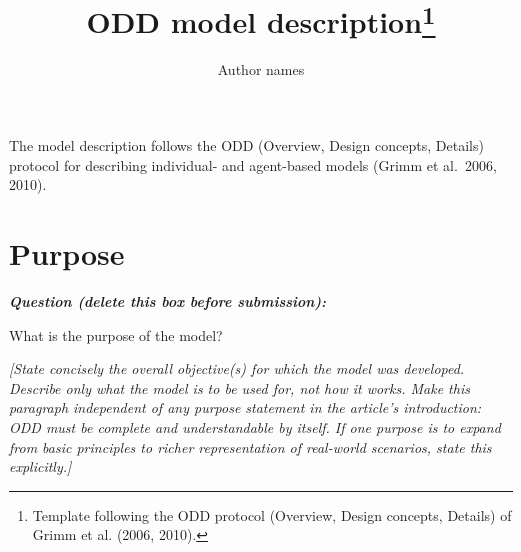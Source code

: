 \documentclass[11pt,a4paper]{article}
\title{ODD model description\thanks{Template following the ODD protocol
(Overview, Design concepts, Details) of Grimm et al. (2006, 2010).}}
\author{Author names}
\date{}
\newenvironment{question}
  {\begin{oddquestion}\small\itshape\color{oddquestioncolor}%
   \textbf{Question (delete this box before submission):}\par\smallskip}
  {\end{oddquestion}}
\begin{document}
\maketitle

The model description follows the ODD (Overview, Design concepts,
Details) protocol for describing individual- and agent-based models
(Grimm et al.\ 2006, 2010).


\section{Purpose}
\begin{question}
What is the purpose of the model?
\end{question}
\textit{[State concisely the overall objective(s) for which the model was
developed. Describe only what the model is to be used for, not how it
works. Make this paragraph independent of any purpose statement in the
article's introduction: ODD must be complete and understandable by
itself. If one purpose is to expand from basic principles to richer
representation of real-world scenarios, state this explicitly.]}

\end{document}
